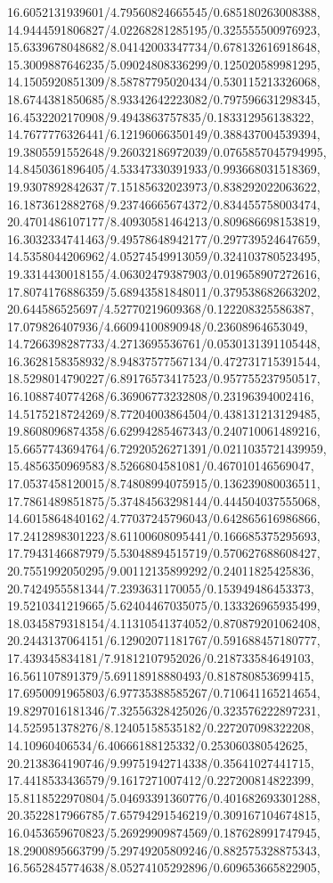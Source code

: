 {16.6052131939601/4.79560824665545/0.685180263008388,
14.9444591806827/4.02268281285195/0.325555500976923,
15.6339678048682/8.04142003347734/0.678132616918648,
15.3009887646235/5.09024808336299/0.125020589981295,
14.1505920851309/8.58787795020434/0.530115213326068,
18.6744381850685/8.93342642223082/0.797596631298345,
16.4532202170908/9.4943863757835/0.183312956138322,
14.7677776326441/6.12196066350149/0.388437004539394,
19.3805591552648/9.26032186972039/0.0765857045794995,
14.8450361896405/4.53347330391933/0.993668031518369,
19.9307892842637/7.15185632023973/0.838292022063622,
16.1873612882768/9.23746665674372/0.834455758003474,
20.4701486107177/8.40930581464213/0.809686698153819,
16.3032334741463/9.49578648942177/0.297739524647659,
14.5358044206962/4.05274549913059/0.324103780523495,
19.3314430018155/4.06302479387903/0.019658907272616,
17.8074176886359/5.68943581848011/0.379538682663202,
20.644586525697/4.52770219609368/0.122208325586387,
17.079826407936/4.66094100890948/0.23608964653049,
14.7266398287733/4.2713695536761/0.0530131391105448,
16.3628158358932/8.94837577567134/0.472731715391544,
18.5298014790227/6.89176573417523/0.957755237950517,
16.1088740774268/6.36906773232808/0.23196394002416,
14.5175218724269/8.77204003864504/0.438131213129485,
19.8608096874358/6.62994285467343/0.240710061489216,
15.6657743694764/6.72920526271391/0.0211035721439959,
15.4856350969583/8.5266804581081/0.467010146569047,
17.0537458120015/8.74808994075915/0.136239080036511,
17.7861489851875/5.37484563298144/0.444504037555068,
14.6015864840162/4.77037245796043/0.642865616986866,
17.2412898301223/8.61100608095441/0.166685375295693,
17.7943146687979/5.53048894515719/0.570627688608427,
20.7551992050295/9.00112135899292/0.24011825425836,
20.7424955581344/7.2393631170055/0.153949486453373,
19.5210341219665/5.62404467035075/0.133326965935499,
18.0345879318154/4.11310541374052/0.870879201062408,
20.2443137064151/6.12902071181767/0.591688457180777,
17.439345834181/7.91812107952026/0.218733584649103,
16.561107891379/5.69118918880493/0.818780853699415,
17.6950091965803/6.97735388585267/0.710641165214654,
19.8297016181346/7.32556328425026/0.323576222897231,
14.525951378276/8.12405158535182/0.227207098322208,
14.10960406534/6.40666188125332/0.253060380542625,
20.2138364190746/9.99751942714338/0.35641027441715,
17.4418533436579/9.1617271007412/0.227200814822399,
15.8118522970804/5.04693391360776/0.401682693301288,
20.3522817966785/7.65794291546219/0.309167104674815,
16.0453659670823/5.26929909874569/0.187628991747945,
18.2900895663799/5.29749205809246/0.882575328875343,
16.5652845774638/8.05274105292896/0.609653665822905,
}
